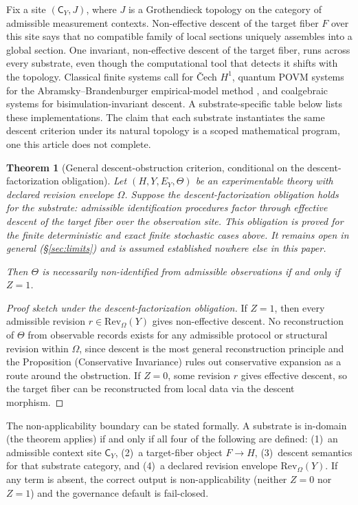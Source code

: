 \documentclass[11pt]{article}
\newtheorem{theorem}{Theorem}
\begin{document}
Fix a site $(\mathsf{C}_Y, J)$, where $J$ is a Grothendieck topology on the
category of admissible measurement contexts. Non-effective descent of the target
fiber $F$ over this site says that no compatible family of local sections
uniquely assembles into a global section. One invariant, non-effective descent
of the target fiber, runs across every substrate, even though the
computational tool that detects it shifts with the topology. Classical finite
systems call for \v{C}ech $H^1$, quantum POVM systems for the
Abramsky--Brandenburger empirical-model method \citep{abramsky2011}, and
coalgebraic systems for bisimulation-invariant descent. A substrate-specific
table below lists these implementations. The claim that each substrate
instantiates the same descent criterion under its natural topology is a scoped
mathematical program, one this article does not complete.

\begin{theorem}[General descent-obstruction criterion, conditional on the descent-factorization obligation]
\label{thm:descent}
Let $(H, Y, E_Y, \Theta)$ be an experimentable theory with declared revision
envelope $\Omega$. Suppose the descent-factorization obligation holds for the
substrate: admissible identification procedures factor through effective descent
of the target fiber over the observation site. This obligation is proved for the
finite deterministic and exact finite stochastic cases above. It remains open in
general (\S\ref{sec:limits}) and is assumed established nowhere else in this
paper.

\medskip
\noindent\textit{Then $\Theta$ is necessarily non-identified from admissible
observations if and only if $Z = 1$.}
\end{theorem}

\begin{proof}[Proof sketch under the descent-factorization obligation]
If $Z = 1$, then every admissible revision $r \in \mathrm{Rev}_\Omega(Y)$
gives non-effective descent.
No reconstruction of $\Theta$ from observable records exists for any
admissible protocol or structural revision within $\Omega$, since descent is
the most general reconstruction principle and the Proposition (Conservative
Invariance) rules out conservative expansion as a route around the
obstruction.
If $Z = 0$, some revision $r$ gives effective descent, so the target fiber
can be reconstructed from local data via the descent morphism.
\end{proof}

The non-applicability boundary can be stated formally.
A substrate is in-domain (the theorem applies) if and only if all four of the
following are defined: (1)~an admissible context site $\mathsf{C}_Y$,
(2)~a target-fiber object $F \to H$, (3)~descent semantics for that substrate
category, and (4)~a declared revision envelope $\mathrm{Rev}_\Omega(Y)$.
If any term is absent, the correct output is non-applicability (neither
$Z = 0$ nor $Z = 1$) and the governance default is fail-closed.
\end{document}
